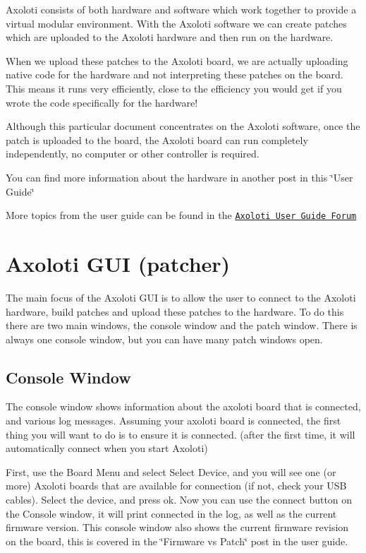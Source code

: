 Axoloti consists of both hardware and software which work together to provide a virtual modular environment. With the Axoloti software we can create \textquotesingle{}patches\textquotesingle{} which are uploaded to the Axoloti hardware and then run on the hardware.

When we upload these patches to the Axoloti board, we are actually uploading native code for the hardware and not interpreting these patches on the board. This means it runs very efficiently, close to the efficiency you would get if you wrote the code specifically for the hardware!

Although this particular document concentrates on the Axoloti software, once the \textquotesingle{}patch\textquotesingle{} is uploaded to the board, the Axoloti board can run completely independently, no computer or other controller is required.

You can find more information about the hardware in another post in this \char`\"{}\+User Guide\char`\"{} 

More topics from the user guide can be found in the \href{http://community.axoloti.com/c/user-guide}{\tt Axoloti User Guide Forum}\hypertarget{axo_gui_axo_gui_axoloti_gui}{}\section{Axoloti G\+U\+I (patcher)}\label{axo_gui_axo_gui_axoloti_gui}
The main focus of the Axoloti G\+UI is to allow the user to connect to the Axoloti hardware, build patches and upload these patches to the hardware. To do this there are two main windows, the console window and the patch window. There is always one console window, but you can have many patch windows open.\hypertarget{axo_gui_axo_gui_axoloti_gui_console}{}\subsection{Console Window}\label{axo_gui_axo_gui_axoloti_gui_console}
The console window shows information about the axoloti board that is connected, and various log messages. Assuming your axoloti board is connected, the first thing you will want to do is to ensure it is connected. (after the first time, it will automatically connect when you start Axoloti)

First, use the \textquotesingle{}Board Menu\textquotesingle{} and select \textquotesingle{}Select Device\textquotesingle{}, and you will see one (or more) Axoloti boards that are available for connection (if not, check your U\+SB cables). Select the device, and press ok. Now you can use the \textquotesingle{}connect\textquotesingle{} button on the Console window, it will print \textquotesingle{}connected\textquotesingle{} in the log, as well as the current firmware version. This console window also shows the current firmware revision on the board, this is covered in the \char`\"{}\+Firmware vs Patch\char`\"{} post in the user guide.

